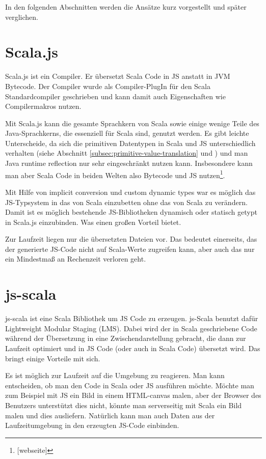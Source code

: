 \documentclass[12pt,bibtotoc]{scrreprt}
\begin{document}
In den folgenden Abschnitten werden die Ansätze kurz vorgestellt und später verglichen.

\section{Scala.js}
\label{sec:scala-js}

Scala.js ist ein Compiler. Er übersetzt Scala Code in JS anstatt in JVM Bytecode\cite{Doeraene2013}. Der Compiler wurde als Compiler-PlugIn für den Scala Standardcompiler geschrieben und kann damit auch Eigenschaften wie Compilermakros nutzen. 

Mit Scala.js kann die gesamte Sprachkern von Scala sowie einige wenige Teile des Java-Sprachkerns, die essenziell für Scala sind, genutzt werden. Es gibt leichte Unterscheide, da sich die primitiven Datentypen in Scala und JS unterschiedlich verhalten (siehe Abschnitt \ref{subsec:primitive-value-translation} und \cite{Doeraene2014}) und man Java runtime reflection nur sehr eingeschränkt nutzen kann. Insbesondere kann man aber Scala Code in beiden Welten also Bytecode und JS nutzen\footnote{[webseite]}. 

Mit Hilfe von implicit conversion und custom dynamic types war es möglich das JS-Typsystem in das von Scala einzubetten ohne das von Scala zu verändern. Damit ist es möglich bestehende JS-Bibliotheken dynamisch oder statisch getypt in Scala.js einzubinden. Was einen großen Vorteil bietet. 

Zur Laufzeit liegen nur die übersetzten Dateien vor. Das bedeutet einerseits, das der generierte JS-Code nicht auf Scala-Werte zugreifen kann, aber auch das nur ein Mindestmaß an Rechenzeit verloren geht.

\section{js-scala}

js-scala ist eine Scala Bibliothek um JS Code zu erzeugen\cite{Kossakowski2012}. js-Scala benutzt dafür Lightweight Modular Staging (LMS)\cite{Rompf2010}. Dabei wird der in Scala geschriebene Code während der Übersetzung in eine Zwischendarstellung gebracht, die dann zur Laufzeit optimiert und in JS Code (oder auch in Scala Code) übersetzt wird. Das bringt einige Vorteile mit sich. 

Es ist möglich zur Laufzeit auf die Umgebung zu reagieren. Man kann entscheiden, ob man den Code in Scala oder JS ausführen möchte. Möchte man zum Beispiel mit JS ein Bild in einem HTML-canvas malen, aber der Browser des Benutzers unterstützt dies nicht, könnte man serverseitig mit Scala ein Bild malen und dies ausliefern. Natürlich kann man auch Daten aus der Laufzeitumgebung in den erzeugten JS-Code einbinden.
\end{document}

